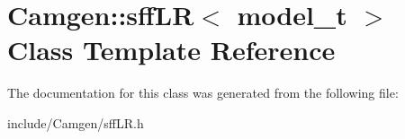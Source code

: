 \hypertarget{a00507}{}\section{Camgen\+:\+:sff\+L\+R$<$ model\+\_\+t $>$ Class Template Reference}
\label{a00507}


The documentation for this class was generated from the following file\+:\begin{DoxyCompactItemize}
\item 
include/\+Camgen/sff\+L\+R.\+h\end{DoxyCompactItemize}
